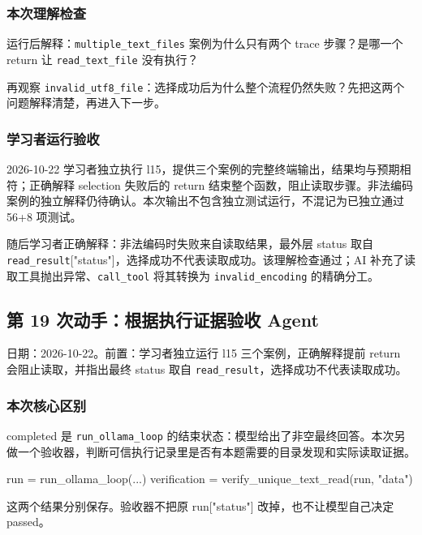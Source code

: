 \documentclass[UTF8,zihao=-4,fontset=fandol]{ctexart}
\begin{document}
\subsubsection{本次理解检查}

运行后解释：\nolinkurl{multiple_text_files} 案例为什么只有两个 trace 步骤？是哪一个 return 让 \nolinkurl{read_text_file} 没有执行？

再观察 \nolinkurl{invalid_utf8_file}：选择成功后为什么整个流程仍然失败？先把这两个问题解释清楚，再进入下一步。

\subsubsection{学习者运行验收}

2026-10-22 学习者独立执行 l15，提供三个案例的完整终端输出，结果均与预期相符；正确解释 selection 失败后的 return 结束整个函数，阻止读取步骤。非法编码案例的独立解释仍待确认。本次输出不包含独立测试运行，不混记为已独立通过 56+8 项测试。

随后学习者正确解释：非法编码时失败来自读取结果，最外层 status 取自 \nolinkurl{read_result}["status"]，选择成功不代表读取成功。该理解检查通过；AI 补充了读取工具抛出异常、\nolinkurl{call_tool} 将其转换为 \nolinkurl{invalid_encoding} 的精确分工。

\subsection{第 19 次动手：根据执行证据验收 Agent}

日期：2026-10-22。前置：学习者独立运行 l15 三个案例，正确解释提前 return 会阻止读取，并指出最终 status 取自 \nolinkurl{read_result}，选择成功不代表读取成功。

\subsubsection{本次核心区别}

completed 是 \nolinkurl{run_ollama_loop} 的结束状态：模型给出了非空最终回答。本次另做一个验收器，判断可信执行记录里是否有本题需要的目录发现和实际读取证据。

\begin{Code}
run = run_ollama_loop(...)
verification = verify_unique_text_read(run, "data")
\end{Code}

这两个结果分别保存。验收器不把原 run["status"] 改掉，也不让模型自己决定 passed。
\end{document}
